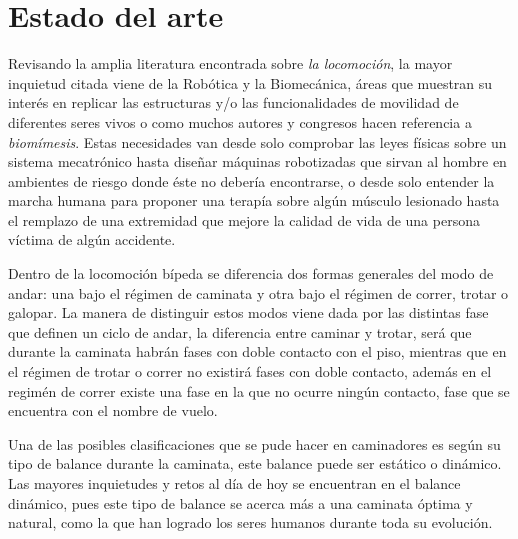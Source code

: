 \section[Estado del arte]{Estado del arte}
\label{sec:arte}

Revisando la amplia literatura encontrada sobre \emph{la locomoci\'on}, la mayor inquietud citada viene de la Rob\'otica\cite{Xiang2010,Mattar2013} y la Biomec\'anica\cite{Xiang2010,Mattar2013}, \'areas que muestran su interés en replicar las estructuras y/o las funcionalidades de movilidad de diferentes seres vivos\cite{Xu2013,Chiang2013} o como muchos autores\cite{Xu2013} y congresos\cite{RB2009} hacen referencia a \emph{biom\'imesis}. Estas necesidades van desde solo comprobar las leyes f\'isicas sobre un sistema mecatr\'onico\cite{Barker2010,Lens2011} hasta dise\~nar m\'aquinas robotizadas que sirvan al hombre en ambientes de riesgo donde \'este no deber\'ia encontrarse\cite{Seifried2014,Wu2013a}, o desde solo entender la marcha humana para proponer una terap\'ia sobre alg\'un m\'usculo lesionado\cite{Kang2013} hasta el remplazo de una extremidad que mejore la calidad de vida de una persona v\'ictima de alg\'un accidente\cite{Roa2006,Wu2013a}.\par
Dentro de la locomoci\'on b\'ipeda se diferencia dos formas generales del modo de andar: una bajo el r\'egimen de caminata y otra bajo el r\'egimen de correr, trotar o galopar\cite{Geyer2006}. La manera de distinguir estos modos viene dada por las distintas fase que definen un ciclo de andar, la diferencia entre caminar y trotar, ser\'a que durante la caminata habr\'an fases con doble contacto con el piso, mientras que en el r\'egimen de trotar o correr no existirá fases con doble contacto\cite{Geyer2006}, adem\'as en el regim\'en de correr existe una fase en la que no ocurre ningún contacto, fase que se encuentra con el nombre de vuelo.\par
Una de las posibles clasificaciones que se pude hacer en caminadores es seg\'un su tipo de balance durante la caminata, este balance puede ser est\'atico o din\'amico\cite{Braunl2008}. Las mayores inquietudes y retos al d\'ia de hoy se encuentran en el balance din\'amico, pues este tipo de balance se acerca m\'as a una caminata \'optima y natural, como la que han logrado los seres humanos durante toda su evoluci\'on.\par

